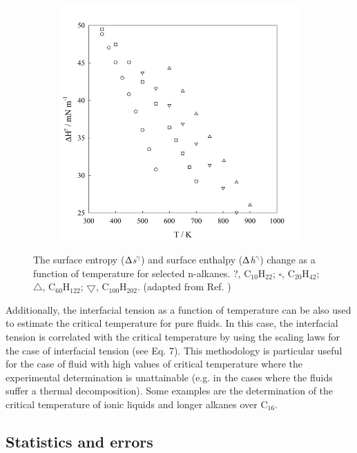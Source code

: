 \documentclass[9pt,bestpractices]{livecoms}
\begin{document}
\begin{figure}
\begin{subfigure}{0.8\linewidth}
    \includegraphics[width=1\textwidth]{gfx/image69.jpeg}
	\end{subfigure}
\caption{The surface entropy (${\Updelta}$\textit{s}$^{\mathrm{{\gamma}}}$)
and surface enthalpy (${\Updelta}$\textit{h}$^{\mathrm{{\gamma}}}$) change as
a function of temperature for selected n-alkanes. ?, C$_{10}$H$_{22}$;
${\square}$, C$_{20}$H$_{42}$; ${\bigtriangleup}$, C$_{60}$H$_{122}$;
${\bigtriangledown}$, C$_{100}$H$_{202}$. (adapted from Ref. \citep{muller2011})}
\label{fig:22}
\end{figure}

Additionally, the interfacial tension as a function of temperature can be also
used to estimate the critical temperature for pure fluids. In this case, the
interfacial tension is correlated with the critical temperature by using the
scaling laws for the case of interfacial tension (see Eq. 7).
This methodology is particular useful for the case of fluid with high values of
critical temperature where the experimental determination is unattainable 
(e.g. in the cases where the fluids suffer a thermal decomposition). Some examples
are the determination of the critical temperature of ionic liquids and
longer alkanes over C$_{16}$.

\subsection{Statistics and errors}
\end{document}
